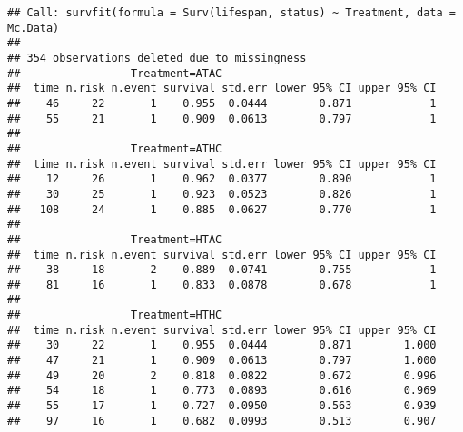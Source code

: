 \documentclass[]{article}
\newenvironment{Shaded}{\begin{snugshade}}{\end{snugshade}}
\newcommand{\KeywordTok}[1]{\textcolor[rgb]{0.13,0.29,0.53}{\textbf{#1}}}
\newcommand{\DataTypeTok}[1]{\textcolor[rgb]{0.13,0.29,0.53}{#1}}
\newcommand{\StringTok}[1]{\textcolor[rgb]{0.31,0.60,0.02}{#1}}
\newcommand{\OperatorTok}[1]{\textcolor[rgb]{0.81,0.36,0.00}{\textbf{#1}}}
\newcommand{\NormalTok}[1]{#1}
\begin{document}
\begin{Shaded}
\end{Shaded}

\begin{verbatim}
## Call: survfit(formula = Surv(lifespan, status) ~ Treatment, data = Mc.Data)
## 
## 354 observations deleted due to missingness 
##                 Treatment=ATAC 
##  time n.risk n.event survival std.err lower 95% CI upper 95% CI
##    46     22       1    0.955  0.0444        0.871            1
##    55     21       1    0.909  0.0613        0.797            1
## 
##                 Treatment=ATHC 
##  time n.risk n.event survival std.err lower 95% CI upper 95% CI
##    12     26       1    0.962  0.0377        0.890            1
##    30     25       1    0.923  0.0523        0.826            1
##   108     24       1    0.885  0.0627        0.770            1
## 
##                 Treatment=HTAC 
##  time n.risk n.event survival std.err lower 95% CI upper 95% CI
##    38     18       2    0.889  0.0741        0.755            1
##    81     16       1    0.833  0.0878        0.678            1
## 
##                 Treatment=HTHC 
##  time n.risk n.event survival std.err lower 95% CI upper 95% CI
##    30     22       1    0.955  0.0444        0.871        1.000
##    47     21       1    0.909  0.0613        0.797        1.000
##    49     20       2    0.818  0.0822        0.672        0.996
##    54     18       1    0.773  0.0893        0.616        0.969
##    55     17       1    0.727  0.0950        0.563        0.939
##    97     16       1    0.682  0.0993        0.513        0.907
\end{verbatim}
\end{document}
